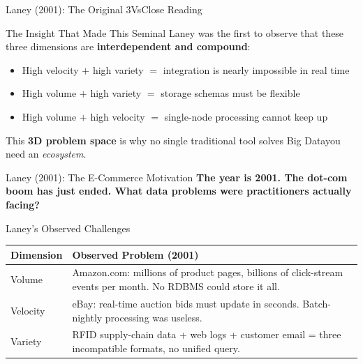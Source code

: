 \documentclass[aspectratio=169,10pt]{beamer}
\begin{document}
\begin{frame}{Laney (2001): The Original 3Vs\textemdash Close Reading}
   
      \begin{alertblock}{The Insight That Made This Seminal}
        Laney was the first to observe that these three dimensions are \textbf{interdependent and compound}:
        \vspace{4pt}
        \begin{itemize}
          \item High velocity $+$ high variety $=$ integration is nearly impossible in real time
          \item High volume $+$ high variety $=$ storage schemas must be flexible
          \item High volume $+$ high velocity $=$ single-node processing cannot keep up
        \end{itemize}
        \vspace{4pt}
        This \textbf{3D problem space} is why no single traditional tool solves Big Data\textemdash you need an \emph{ecosystem}.
      \end{alertblock}
 
\end{frame}
\begin{frame}{Laney (2001): The E-Commerce Motivation}
      \textbf{The year is 2001.  The dot-com boom has just ended.  What data problems were practitioners actually facing?}
      \vspace{8pt}
      \begin{block}{Laney's Observed Challenges}
        \renewcommand{\arraystretch}{1.3}
        \begin{tabular}{p{1.8cm}p{12.2cm}}
          \toprule
          \textbf{Dimension} & \textbf{Observed Problem (2001)} \\
          \midrule
          Volume   & Amazon.com: millions of product pages, billions of click-stream events per month.  No RDBMS could store it all. \\
          Velocity & eBay: real-time auction bids must update in seconds.  Batch-nightly processing was useless. \\
          Variety  & RFID supply-chain data + web logs + customer email = three incompatible formats, no unified query. \\
          \bottomrule
        \end{tabular}
      \end{block}

    
\end{frame}
\end{document}
